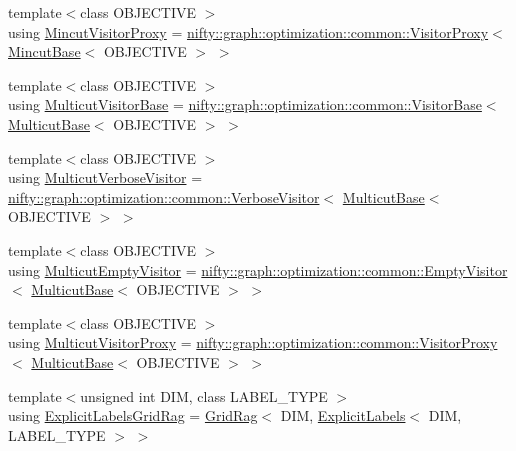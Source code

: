 \begin{DoxyCompactItemize}
\item 
{\footnotesize template$<$class O\+B\+J\+E\+C\+T\+I\+V\+E $>$ }\\using \hyperlink{namespacenifty_1_1graph_ac6c35595563f4188e7cbac37871801b8}{Mincut\+Visitor\+Proxy} = \hyperlink{classnifty_1_1graph_1_1optimization_1_1common_1_1VisitorProxy}{nifty\+::graph\+::optimization\+::common\+::\+Visitor\+Proxy}$<$ \hyperlink{classnifty_1_1graph_1_1MincutBase}{Mincut\+Base}$<$ O\+B\+J\+E\+C\+T\+I\+V\+E $>$ $>$
\item 
{\footnotesize template$<$class O\+B\+J\+E\+C\+T\+I\+V\+E $>$ }\\using \hyperlink{namespacenifty_1_1graph_a33375e819f3dda82c6458bdc3cfbe81a}{Multicut\+Visitor\+Base} = \hyperlink{classnifty_1_1graph_1_1optimization_1_1common_1_1VisitorBase}{nifty\+::graph\+::optimization\+::common\+::\+Visitor\+Base}$<$ \hyperlink{classnifty_1_1graph_1_1MulticutBase}{Multicut\+Base}$<$ O\+B\+J\+E\+C\+T\+I\+V\+E $>$ $>$
\item 
{\footnotesize template$<$class O\+B\+J\+E\+C\+T\+I\+V\+E $>$ }\\using \hyperlink{namespacenifty_1_1graph_a8b139ea9e1b9c08234fb388f35bd9e75}{Multicut\+Verbose\+Visitor} = \hyperlink{classnifty_1_1graph_1_1optimization_1_1common_1_1VerboseVisitor}{nifty\+::graph\+::optimization\+::common\+::\+Verbose\+Visitor}$<$ \hyperlink{classnifty_1_1graph_1_1MulticutBase}{Multicut\+Base}$<$ O\+B\+J\+E\+C\+T\+I\+V\+E $>$ $>$
\item 
{\footnotesize template$<$class O\+B\+J\+E\+C\+T\+I\+V\+E $>$ }\\using \hyperlink{namespacenifty_1_1graph_a37de21ae53be2952a5876727dadceed1}{Multicut\+Empty\+Visitor} = \hyperlink{classnifty_1_1graph_1_1optimization_1_1common_1_1EmptyVisitor}{nifty\+::graph\+::optimization\+::common\+::\+Empty\+Visitor}$<$ \hyperlink{classnifty_1_1graph_1_1MulticutBase}{Multicut\+Base}$<$ O\+B\+J\+E\+C\+T\+I\+V\+E $>$ $>$
\item 
{\footnotesize template$<$class O\+B\+J\+E\+C\+T\+I\+V\+E $>$ }\\using \hyperlink{namespacenifty_1_1graph_a53f439b765cf049a489391b5a4dd7c36}{Multicut\+Visitor\+Proxy} = \hyperlink{classnifty_1_1graph_1_1optimization_1_1common_1_1VisitorProxy}{nifty\+::graph\+::optimization\+::common\+::\+Visitor\+Proxy}$<$ \hyperlink{classnifty_1_1graph_1_1MulticutBase}{Multicut\+Base}$<$ O\+B\+J\+E\+C\+T\+I\+V\+E $>$ $>$
\item 
{\footnotesize template$<$unsigned int D\+I\+M, class L\+A\+B\+E\+L\+\_\+\+T\+Y\+P\+E $>$ }\\using \hyperlink{namespacenifty_1_1graph_a45cca2dcd061996d13ec8e6bb8afb200}{Explicit\+Labels\+Grid\+Rag} = \hyperlink{classnifty_1_1graph_1_1GridRag}{Grid\+Rag}$<$ D\+I\+M, \hyperlink{classnifty_1_1graph_1_1ExplicitLabels}{Explicit\+Labels}$<$ D\+I\+M, L\+A\+B\+E\+L\+\_\+\+T\+Y\+P\+E $>$ $>$

\end{DoxyCompactItemize}
